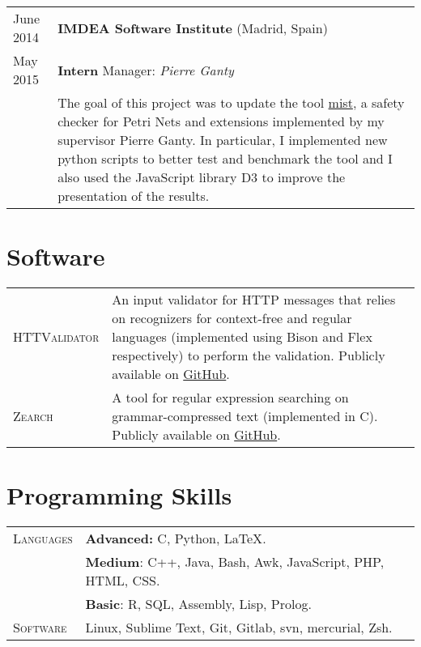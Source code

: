 \documentclass[a4paper,10pt]{article} %
\begin{document}
\begin{tabular}{p{2.6cm}p{12.5cm}}
June 2014 & \textbf{IMDEA Software Institute} (Madrid, Spain) \\
May 2015 & \textcolor{azureblue}{\textbf{Intern}} \hfill Manager: \emph{Pierre Ganty}\\
& The goal of this project was to update the tool \href{https://github.com/pierreganty/mist/wiki}{mist}, a safety checker for Petri Nets and extensions implemented by my supervisor Pierre Ganty.
In particular, I implemented new python scripts to better test and benchmark the tool and I also used the JavaScript library D3 to improve the presentation of the results. 
\end{tabular}

\section{Software}

\begin{tabular}{p{2.6cm}p{12.5cm}}
\textsc{HTTValidator} & An input validator for HTTP messages that relies on recognizers for context-free and regular languages (implemented using Bison and Flex respectively) to perform the validation. Publicly available on \href{https://github.com/pevalme/HTTPValidator}{GitHub}. \\

\textsc{Zearch} & A tool for regular expression searching on grammar-compressed text (implemented in C). Publicly available on \href{https://github.com/pevalme/zearch}{GitHub}.\\
\end{tabular}

\section{Programming Skills}
\begin{tabular}{p{2.6cm}p{12.5cm}}
\textsc{Languages} & {\Large\textcolor{battleshipgrey}{\textbf{Advanced:}} C, Python, \LaTeX}.\\
[1pt]
& {\large\textcolor{battleshipgrey}{\textbf{Medium}}: C++, Java, Bash, Awk, JavaScript, PHP, HTML, CSS}.\\
& \textcolor{battleshipgrey}{\textbf{Basic}}: R, SQL, Assembly, Lisp, Prolog.\\
[3pt]
\textsc{Software} & Linux, Sublime Text, Git, Gitlab, svn, mercurial, Zsh.\\
\end{tabular}
\end{document}

